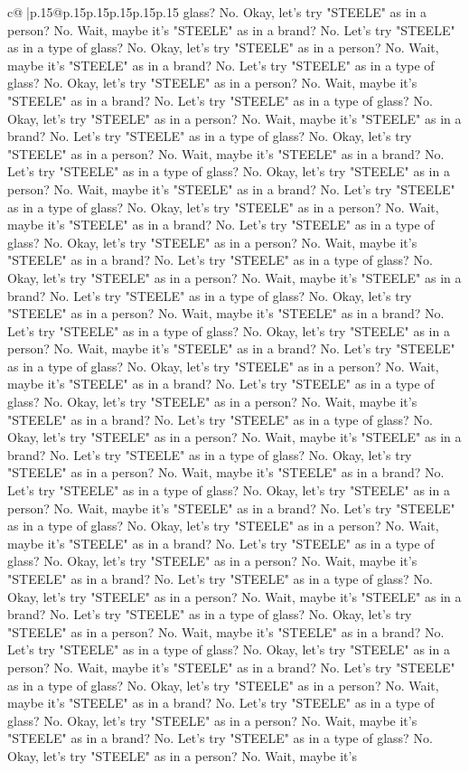 \documentclass{article}
\begin{document}
{\begin{supertabular}{c@{$\;$}|p{.15\linewidth}@{}p{.15\linewidth}p{.15\linewidth}p{.15\linewidth}p{.15\linewidth}p{.15\linewidth}}
{{{glass? No. Okay, let's try "STEELE" as in a person? No. Wait, maybe it's "STEELE" as in a brand? No. Let's try "STEELE" as in a type of glass? No. Okay, let's try "STEELE" as in a person? No. Wait, maybe it's "STEELE" as in a brand? No. Let's try "STEELE" as in a type of glass? No. Okay, let's try "STEELE" as in a person? No. Wait, maybe it's "STEELE" as in a brand? No. Let's try "STEELE" as in a type of glass? No. Okay, let's try "STEELE" as in a person? No. Wait, maybe it's "STEELE" as in a brand? No. Let's try "STEELE" as in a type of glass? No. Okay, let's try "STEELE" as in a person? No. Wait, maybe it's "STEELE" as in a brand? No. Let's try "STEELE" as in a type of glass? No. Okay, let's try "STEELE" as in a person? No. Wait, maybe it's "STEELE" as in a brand? No. Let's try "STEELE" as in a type of glass? No. Okay, let's try "STEELE" as in a person? No. Wait, maybe it's "STEELE" as in a brand? No. Let's try "STEELE" as in a type of glass? No. Okay, let's try "STEELE" as in a person? No. Wait, maybe it's "STEELE" as in a brand? No. Let's try "STEELE" as in a type of glass? No. Okay, let's try "STEELE" as in a person? No. Wait, maybe it's "STEELE" as in a brand? No. Let's try "STEELE" as in a type of glass? No. Okay, let's try "STEELE" as in a person? No. Wait, maybe it's "STEELE" as in a brand? No. Let's try "STEELE" as in a type of glass? No. Okay, let's try "STEELE" as in a person? No. Wait, maybe it's "STEELE" as in a brand? No. Let's try "STEELE" as in a type of glass? No. Okay, let's try "STEELE" as in a person? No. Wait, maybe it's "STEELE" as in a brand? No. Let's try "STEELE" as in a type of glass? No. Okay, let's try "STEELE" as in a person? No. Wait, maybe it's "STEELE" as in a brand? No. Let's try "STEELE" as in a type of glass? No. Okay, let's try "STEELE" as in a person? No. Wait, maybe it's "STEELE" as in a brand? No. Let's try "STEELE" as in a type of glass? No. Okay, let's try "STEELE" as in a person? No. Wait, maybe it's "STEELE" as in a brand? No. Let's try "STEELE" as in a type of glass? No. Okay, let's try "STEELE" as in a person? No. Wait, maybe it's "STEELE" as in a brand? No. Let's try "STEELE" as in a type of glass? No. Okay, let's try "STEELE" as in a person? No. Wait, maybe it's "STEELE" as in a brand? No. Let's try "STEELE" as in a type of glass? No. Okay, let's try "STEELE" as in a person? No. Wait, maybe it's "STEELE" as in a brand? No. Let's try "STEELE" as in a type of glass? No. Okay, let's try "STEELE" as in a person? No. Wait, maybe it's "STEELE" as in a brand? No. Let's try "STEELE" as in a type of glass? No. Okay, let's try "STEELE" as in a person? No. Wait, maybe it's "STEELE" as in a brand? No. Let's try "STEELE" as in a type of glass? No. Okay, let's try "STEELE" as in a person? No. Wait, maybe it's "STEELE" as in a brand? No. Let's try "STEELE" as in a type of glass? No. Okay, let's try "STEELE" as in a person? No. Wait, maybe it's "STEELE" as in a brand? No. Let's try "STEELE" as in a type of glass? No. Okay, let's try "STEELE" as in a person? No. Wait, maybe it's "STEELE" as in a brand? No. Let's try "STEELE" as in a type of glass? No. Okay, let's try "STEELE" as in a person? No. Wait, maybe it's }}}
\end{supertabular}}
\end{document}
